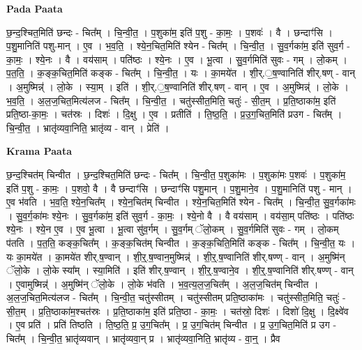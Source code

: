\documentclass[17pt]{extarticle}
\begin{document}
\textbf{Pada Paata} \newline

छ॒न्द॒श्चित॒मिति॑ छन्दः - चित᳚म् । चि॒न्वी॒त॒ । प॒शुका॑म॒ इति॑ प॒शु - का॒मः॒ । प॒शवः॑ । वै । छन्दाꣳ॑सि । प॒शु॒मानिति॑ पशु-मान् । ए॒व । भ॒व॒ति॒ । श्ये॒न॒चित॒मिति॑ श्येन - चित᳚म् । चि॒न्वी॒त॒ । सु॒व॒र्गका॑म॒ इति॑ सुव॒र्ग - का॒मः॒ । श्ये॒नः । वै । वय॑साम् । पति॑ष्ठः । श्ये॒नः । ए॒व । भू॒त्वा । सु॒व॒र्गमिति॑ सुवः - गम् । लो॒कम् । प॒त॒ति॒ । क॒ङ्क॒चित॒मिति॑ कङ्क - चित᳚म् । चि॒न्वी॒त॒ । यः । का॒मये॑त । शी॒र्.॒ष॒ण्वानिति॑ शीर्.षण् - वान् । अ॒मुष्मिन्न्॑ । लो॒के । स्या॒म् । इति॑ । शी॒र्.॒ष॒ण्वानिति॑ शीर्.षण् - वान् । ए॒व । अ॒मुष्मिन्न्॑ । लो॒के । भ॒व॒ति॒ । अ॒ल॒ज॒चित॒मित्य॑लज - चित᳚म् । चि॒न्वी॒त॒ । चतु॑स्सीत॒मिति॒ चतुः॑ - सी॒त॒म् । प्र॒ति॒ष्ठाका॑म॒ इति॑ प्रति॒ष्ठा-का॒मः॒ । चत॑स्रः । दिशः॑ । दि॒क्षु । ए॒व । प्रतीति॑ । ति॒ष्ठ॒ति॒ । प्र॒उ॒ग॒चित॒मिति॑ प्र‌उग - चित᳚म् । चि॒न्वी॒त॒ । भ्रातृ॑व्यवा॒निति॒ भ्रातृ॑व्य - वान् । प्रेति॑ ।  \newline


\textbf{Krama Paata} \newline

छ॒न्द॒श्चित॑म् चिन्वीत । छ॒न्द॒श्चित॒मिति॑ छन्दः - चित᳚म् । चि॒न्वी॒त॒ प॒शुका॑मः । प॒शुका॑मः प॒शवः॑ । प॒शुका॑म॒ इति॑ प॒शु - का॒मः॒ । प॒शवो॒ वै । वै छन्दाꣳ॑सि । छन्दाꣳ॑सि पशु॒मान् । प॒शु॒माने॒व । प॒शु॒मानिति॑ पशु - मान् । ए॒व भ॑वति । भ॒व॒ति॒ श्ये॒न॒चित᳚म् । श्ये॒न॒चित॑म् चिन्वीत । श्ये॒न॒चित॒मिति॑ श्येन - चित᳚म् । चि॒न्वी॒त॒ सु॒व॒र्गका॑मः । सु॒व॒र्ग॒का॑मः श्ये॒नः । सु॒व॒र्गका॑म॒ इति॑ सुव॒र्ग - का॒मः॒ । श्ये॒नो वै । वै वय॑साम् । वय॑सा॒म् पति॑ष्ठः । पति॑ष्ठः श्ये॒नः । श्ये॒न ए॒व । ए॒व भू॒त्वा । भू॒त्वा सु॑व॒र्गम् । सु॒व॒र्गम् ॅलो॒कम् । सु॒व॒र्गमिति॑ सुवः - गम् । लो॒कम् प॑तति । प॒त॒ति॒ कङ्क॒चित᳚म् । क॒ङ्क॒चित॑म् चिन्वीत । क॒ङ्क॒चिति॒मिति॑ कङ्क - चित᳚म् । चि॒न्वी॒त॒ यः । यः का॒मये॑त । का॒मये॑त शीर्.ष॒ण्वान् । शी॒र्॒.ष॒ण्वान॒मुष्मिन्न्॑ । शी॒र्॒.ष॒ण्वानिति॑ शीर्.षण्ण् - वान् । अ॒मुष्मि॑न् ॅलो॒के । लो॒के स्या᳚म् । स्या॒मिति॑ । इति॑ शीर्.ष॒ण्वान् । शी॒र्॒.ष॒ण्वाने॒व । शी॒र्॒.ष॒ण्वानिति॑ शीर्.षण्ण् - वान् । ए॒वामुष्मिन्न्॑ । अ॒मुष्मि॑न् ॅलो॒के । लो॒के भ॑वति । भ॒व॒त्य॒ल॒ज॒चित᳚म् । अ॒ल॒ज॒चित॑म् चिन्वीत । अ॒ल॒ज॒चित॒मित्य॑लज - चित᳚म् । चि॒न्वी॒त॒ चतु॑स्सीतम् । चतु॑स्सीतम् प्रति॒ष्ठाका॑मः । चतु॑स्सीत॒मिति॒ चतुः॑ - सी॒त॒म् । प्र॒ति॒ष्ठाका॑म॒श्चत॑स्रः । प्र॒ति॒ष्ठाका॑म॒ इति॑ प्रति॒ष्ठा - का॒मः॒ । चत॑स्रो॒ दिशः॑ । दिशो॑ दि॒क्षु । दि॒क्ष्वे॑व । ए॒व प्रति॑ । प्रति॑ तिष्ठति । ति॒ष्ठ॒ति॒ प्र॒ उ॒ग॒चित᳚म् । प्र॒ उ॒ग॒चित॑म् चिन्वीत । प्र॒ उ॒ग॒चित॒मिति॑ प्र उग - चित᳚म् । चि॒न्वी॒त॒ भ्रातृ॑व्यवान् । भ्रातृ॑व्यवा॒न् प्र । भ्रातृ॑व्यवा॒निति॒ भ्रातृ॑व्य - वा॒न्॒ । प्रैव \newline
\end{document}
